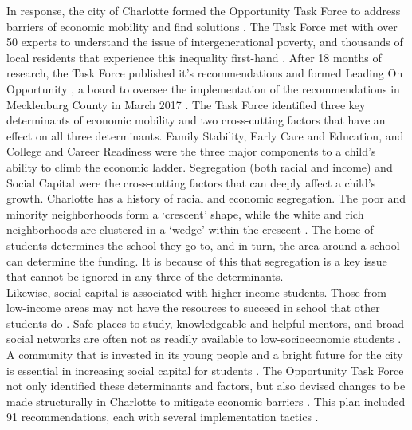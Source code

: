 In response, the city of Charlotte formed the Opportunity Task Force to address barriers of economic mobility and find solutions \parencite[][]{LOO}. The Task Force met with over 50 experts to understand the issue of intergenerational poverty, and thousands of local residents that experience this inequality first-hand \parencite[][p. ii]{LOO}. 
After 18 months of research, the Task Force published it's recommendations and formed Leading On Opportunity \parencite[][]{LOO}, a board to oversee the implementation of the recommendations in Mecklenburg County in March 2017 \parencite[][p. ii]{LOO}. 
The Task Force identified three key determinants of economic mobility and two cross-cutting factors that have an effect on all three determinants. 
Family Stability, Early Care and Education, and College and Career Readiness were the three major components to a child's ability to climb the economic ladder. Segregation (both racial and income) and Social Capital were the cross-cutting factors that can deeply affect a child's growth. 
Charlotte has a history of racial and economic segregation. 
The poor and minority neighborhoods form a `crescent' shape, while the white and rich neighborhoods are clustered in a `wedge' within the crescent \parencite[][p. iii]{LOO}. 
The home of students determines the school they go to, and in turn, the area around a school can determine the funding. It is because of this that segregation is a key issue that cannot be ignored in any three of the determinants.
\\

Likewise, social capital is associated with higher income students. Those from low-income areas may not have the resources to succeed in school that other students do \parencite[][p. viii]{LOO}. 
Safe places to study, knowledgeable and helpful mentors, and broad social networks are often not as readily available to low-socioeconomic students \parencite[][p. viii]{LOO}. 
A community that is invested in its young people and a bright future for the city is essential in increasing social capital for students \parencite[][p. iv]{LOO}. 
The Opportunity Task Force not only identified these determinants and factors, but also devised changes to be made structurally in 
Charlotte to mitigate economic barriers \parencite[][p. ii]{LOO}.
This plan included 91 recommendations, each with several implementation tactics \parencite[][p. ii]{LOO}.





